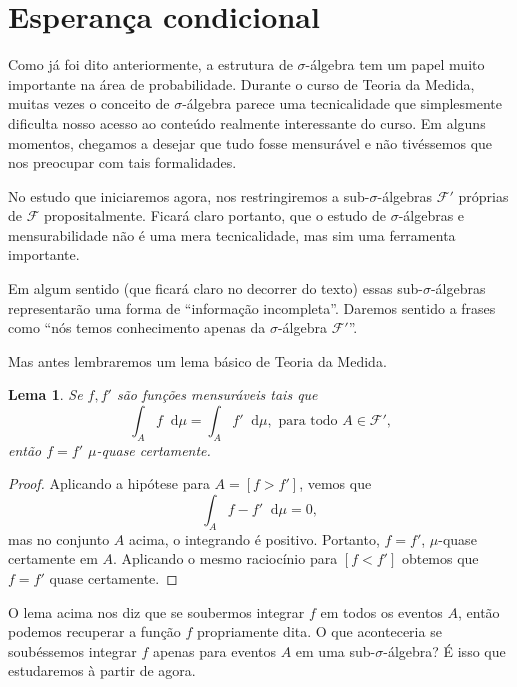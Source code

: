 \documentclass[reqno, final]{book}
\newcommand*\1{\mathds{1}}
\newtheorem{lemma}[theorem]{Lema}
\renewcommand*\d{\mathop{}\!\mathrm{d}}
\begin{document}
\section{Esperança condicional}

Como já foi dito anteriormente, a estrutura de $\sigma$-álgebra tem um papel muito importante na área de probabilidade.
Durante o curso de Teoria da Medida, muitas vezes o conceito de $\sigma$-álgebra parece uma tecnicalidade que simplesmente dificulta nosso acesso ao conteúdo realmente interessante do curso.
Em alguns momentos, chegamos a desejar que tudo fosse mensurável e não tivéssemos que nos preocupar com tais formalidades.

No estudo que iniciaremos agora, nos restringiremos a sub-$\sigma$-álgebras $\mathcal{F}'$ próprias de $\mathcal{F}$ propositalmente.
Ficará claro portanto, que o estudo de $\sigma$-álgebras e mensurabilidade não é uma mera tecnicalidade, mas sim uma ferramenta importante.

Em algum sentido (que ficará claro no decorrer do texto) essas sub-$\sigma$-ál\-ge\-bras representarão uma forma de ``informação incompleta''.
Daremos sentido a frases como ``nós temos conhecimento apenas da $\sigma$-álgebra $\mathcal{F}'$''.

Mas antes lembraremos um lema básico de Teoria da Medida.

\begin{lemma}
  \label{l:f_igual_fp}
  Se $f, f'$ são funções mensuráveis tais que
  \begin{equation}
    \int_A f \d \mu = \int_A f' \d \mu, \text{ para todo $A \in \mathcal{F}'$,}
  \end{equation}
  então $f = f'$ $\mu$-quase certamente.
\end{lemma}

\begin{proof}
  Aplicando a hipótese para $A = [f > f']$, vemos que
  \begin{equation}
    \int_A f - f' \d \mu = 0,
  \end{equation}
  mas no conjunto $A$ acima, o integrando é positivo.
  Portanto, $f = f'$, $\mu$-quase certamente em $A$.
  Aplicando o mesmo raciocínio para $[f < f']$ obtemos que $f = f'$ quase certamente.
\end{proof}

O lema acima nos diz que se soubermos integrar $f$ em todos os eventos $A$, então podemos recuperar a função $f$ propriamente dita.
O que aconteceria se soubéssemos integrar $f$ apenas para eventos $A$ em uma sub-$\sigma$-álgebra?
É isso que estudaremos à partir de agora.
\end{document}
